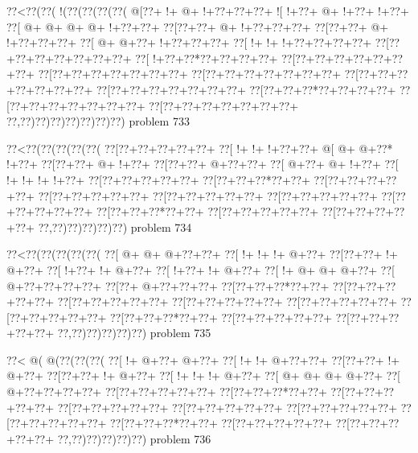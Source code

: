 \vbox{\vbox{\goo
\0??<\0??(\0??(\- !(\0??(\0??(\0??(\0??(
\- @[\0??+\- !+\- @+\- !+\0??+\0??+\0??+
\- ![\- !+\0??+\- @+\- !+\0??+\- !+\0??+
\0??[\- @+\- @+\- @+\- @+\- !+\0??+\0??+
\0??[\0??+\0??+\- @+\- !+\0??+\0??+\0??+
\0??[\0??+\0??+\- @+\- !+\0??+\0??+\0??+
\0??[\- @+\- @+\0??+\- !+\0??+\0??+\0??+
\0??[\- !+\- !+\- !+\0??+\0??+\0??+\0??+
\0??[\0??+\0??+\0??+\0??+\0??+\0??+\0??+
\0??[\- !+\0??+\0??*\0??+\0??+\0??+\0??+
\0??[\0??+\0??+\0??+\0??+\0??+\0??+\0??+
\0??[\0??+\0??+\0??+\0??+\0??+\0??+\0??+
\0??[\0??+\0??+\0??+\0??+\0??+\0??+\0??+
\0??[\0??+\0??+\0??+\0??+\0??+\0??+\0??+
\0??[\0??+\0??+\0??+\0??+\0??+\0??+\0??+
\0??[\0??+\0??+\0??*\0??+\0??+\0??+\0??+
\0??[\0??+\0??+\0??+\0??+\0??+\0??+\0??+
\0??[\0??+\0??+\0??+\0??+\0??+\0??+\0??+
\0??,\0??)\0??)\0??)\0??)\0??)\0??)\0??)
}
\hfil problem 733\hfil\break
}

\vbox{\vbox{\goo
\0??<\0??(\0??(\0??(\0??(\0??(
\0??[\0??+\0??+\0??+\0??+\0??+
\0??[\- !+\- !+\- !+\0??+\0??+
\- @[\- @+\- @+\0??*\- !+\0??+
\0??[\0??+\0??+\- @+\- !+\0??+
\0??[\0??+\0??+\- @+\0??+\0??+
\0??[\- @+\0??+\- @+\- !+\0??+
\0??[\- !+\- !+\- !+\- !+\0??+
\0??[\0??+\0??+\0??+\0??+\0??+
\0??[\0??+\0??+\0??*\0??+\0??+
\0??[\0??+\0??+\0??+\0??+\0??+
\0??[\0??+\0??+\0??+\0??+\0??+
\0??[\0??+\0??+\0??+\0??+\0??+
\0??[\0??+\0??+\0??+\0??+\0??+
\0??[\0??+\0??+\0??+\0??+\0??+
\0??[\0??+\0??+\0??*\0??+\0??+
\0??[\0??+\0??+\0??+\0??+\0??+
\0??[\0??+\0??+\0??+\0??+\0??+
\0??,\0??)\0??)\0??)\0??)\0??)
}
\hfil problem 734\hfil\break
}

\vbox{\vbox{\goo
\0??<\0??(\0??(\0??(\0??(\0??(
\0??[\- @+\- @+\- @+\0??+\0??+
\0??[\- !+\- !+\- !+\- @+\0??+
\0??[\0??+\0??+\- !+\- @+\0??+
\0??[\- !+\0??+\- !+\- @+\0??+
\0??[\- !+\0??+\- !+\- @+\0??+
\0??[\- !+\- @+\- @+\- @+\0??+
\0??[\- @+\0??+\0??+\0??+\0??+
\0??[\0??+\- @+\0??+\0??+\0??+
\0??[\0??+\0??+\0??*\0??+\0??+
\0??[\0??+\0??+\0??+\0??+\0??+
\0??[\0??+\0??+\0??+\0??+\0??+
\0??[\0??+\0??+\0??+\0??+\0??+
\0??[\0??+\0??+\0??+\0??+\0??+
\0??[\0??+\0??+\0??+\0??+\0??+
\0??[\0??+\0??+\0??*\0??+\0??+
\0??[\0??+\0??+\0??+\0??+\0??+
\0??[\0??+\0??+\0??+\0??+\0??+
\0??,\0??)\0??)\0??)\0??)\0??)
}
\hfil problem 735\hfil\break
}

\vbox{\vbox{\goo
\0??<\- @(\- @(\0??(\0??(\0??(
\0??[\- !+\- @+\0??+\- @+\0??+
\0??[\- !+\- !+\- @+\0??+\0??+
\0??[\0??+\0??+\- !+\- @+\0??+
\0??[\0??+\0??+\- !+\- @+\0??+
\0??[\- !+\- !+\- !+\- @+\0??+
\0??[\- @+\- @+\- @+\- @+\0??+
\0??[\- @+\0??+\0??+\0??+\0??+
\0??[\0??+\0??+\0??+\0??+\0??+
\0??[\0??+\0??+\0??*\0??+\0??+
\0??[\0??+\0??+\0??+\0??+\0??+
\0??[\0??+\0??+\0??+\0??+\0??+
\0??[\0??+\0??+\0??+\0??+\0??+
\0??[\0??+\0??+\0??+\0??+\0??+
\0??[\0??+\0??+\0??+\0??+\0??+
\0??[\0??+\0??+\0??*\0??+\0??+
\0??[\0??+\0??+\0??+\0??+\0??+
\0??[\0??+\0??+\0??+\0??+\0??+
\0??,\0??)\0??)\0??)\0??)\0??)
}
\hfil problem 736\hfil\break
}

